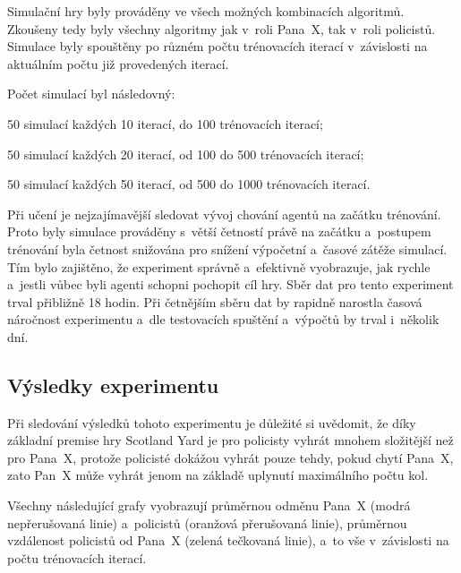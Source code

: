 Simulační hry byly prováděny ve všech možných kombinacích algoritmů.
Zkoušeny tedy byly všechny algoritmy jak v~roli Pana~X, tak v~roli policistů.
Simulace byly spouštěny po různém počtu trénovacích iterací v~závislosti na aktuálním počtu již provedených iterací.\pagebreak

Počet simulací byl následovný:
\begin{myitemize}
  \item 50 simulací každých 10 iterací, do 100 trénovacích iterací;
  \item 50 simulací každých 20 iterací, od 100 do 500 trénovacích iterací;
  \item 50 simulací každých 50 iterací, od 500 do 1000 trénovacích iterací.
\end{myitemize}

Při učení je nejzajímavější sledovat vývoj chování agentů na začátku trénování.
Proto byly simulace prováděny s~větší četností právě na začátku a~postupem trénování byla četnost snižována pro snížení výpočetní a~časové zátěže simulací.
Tím bylo zajištěno, že experiment správně a~efektivně vyobrazuje, jak rychle a~jestli vůbec byli agenti schopni pochopit cíl hry.
Sběr dat pro tento experiment trval přibližně 18 hodin.
Při četnějším sběru dat by rapidně narostla časová náročnost experimentu a~dle testovacích spuštění a~výpočtů by trval i~několik dní.

\subsection{Výsledky experimentu}
\label{subsec:vysledky-experimentu-1}

Při sledování výsledků tohoto experimentu je důležité si uvědomit, že díky základní premise hry Scotland Yard je pro policisty vyhrát mnohem složitější než pro Pana~X, protože policisté dokážou vyhrát pouze tehdy, pokud chytí Pana~X, zato Pan~X může vyhrát jenom na základě uplynutí maximálního počtu kol.

Všechny následující grafy vyobrazují průměrnou odměnu Pana~X (modrá nepřerušovaná linie) a~policistů (oranžová přerušovaná linie), průměrnou vzdálenost policistů od Pana~X (zelená tečkovaná linie), a~to vše v~závislosti na počtu trénovacích iterací.

